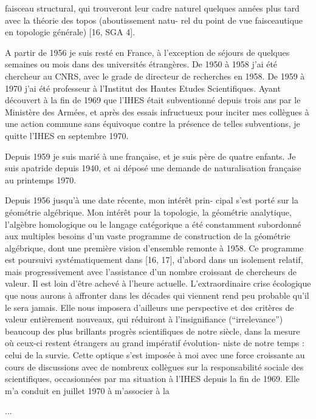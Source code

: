
faisceau structural, qui trouveront leur cadre naturel quelques
années plus tard avec la théorie des topos (aboutissement natu-%
rel du point de vue faisceautique en topologie générale) [16,
SGA 4].

A partir de 1956 je suis resté en France, à l'exception
de séjours de quelques semaines ou mois dans des universités
étrangères. De 1950 à 1958 j'ai été chercheur au CNRS, avec le
grade de directeur de recherches en 1958. De 1959 à 1970 j'ai
été professeur à l'Institut des Hautes Etudes Scientifiques.
Ayant découvert à la fin de 1969 que l'IHES était subventionné
depuis trois ans par le Ministère des Armées, et après des essais
infructueux pour inciter mes collègues à une action commune sans
équivoque contre la présence de telles subventions, je quitte
l'IHES en septembre 1970.

Depuis 1959 je suis marié à une française, et je suis
père de quatre enfants. Je suis apatride depuis 1940, et ai
déposé une demande de naturalisation française au printemps 1970.

Depuis 1956 jusqu'à une date récente, mon intérêt prin-%
cipal s'est porté sur la géométrie algébrique. Mon intérêt pour
la topologie, la géométrie analytique, l'algèbre homologique ou
le langage catégorique a été constamment subordonné aux multiples
besoins d'un vaste programme de construction de la géométrie
algébrique, dont une première vision d'ensemble remonte à 1958.
Ce programme est poursuivi systématiquement dans [16, 17], d'abord
dans un isolement relatif, mais progressivement avec l'assistance
d'un nombre croissant de chercheurs de valeur. Il est loin d'être
achevé à l'heure actuelle. L'extraordinaire crise écologique que
nous aurons à affronter dans les décades qui viennent rend peu
probable qu'il le sera jamais. Elle nous imposera d'ailleurs
une perspective et des critères de valeur entièrement nouveaux,
qui réduiront à l'insignifiance (``irrelevance'') beaucoup des
plus brillants progrès scientifiques de notre siècle, dans la
mesure où ceux-ci restent étrangers au grand impératif évolution-%
niste de notre temps : celui de la survie. Cette optique s'est
imposée à moi avec une force croissante au cours de discussions
avec de nombreux collègues sur la responsabilité sociale des
scientifiques, occasionnées par ma situation à l'IHES depuis la
fin de 1969. Elle m'a conduit en juillet 1970 à m'associer à la

 \hfill ...
